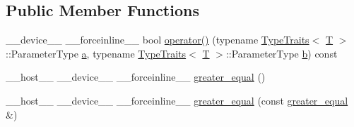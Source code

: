 \subsection*{Public Member Functions}
\begin{DoxyCompactItemize}
\item 
\-\_\-\-\_\-device\-\_\-\-\_\- \-\_\-\-\_\-forceinline\-\_\-\-\_\- bool \hyperlink{structcv_1_1gpu_1_1device_1_1greater__equal_adfbfbc0ec10ad992a95dff431334a5f9}{operator()} (typename \hyperlink{structcv_1_1gpu_1_1device_1_1TypeTraits}{Type\-Traits}$<$ \hyperlink{calib3d_8hpp_a3efb9551a871ddd0463079a808916717}{T} $>$\-::Parameter\-Type \hyperlink{legacy_8hpp_a1031d0e0a97a340abfe0a6ab9e831045}{a}, typename \hyperlink{structcv_1_1gpu_1_1device_1_1TypeTraits}{Type\-Traits}$<$ \hyperlink{calib3d_8hpp_a3efb9551a871ddd0463079a808916717}{T} $>$\-::Parameter\-Type \hyperlink{legacy_8hpp_ac04272e8ca865b8fba18d36edae9fd2a}{b}) const 
\item 
\-\_\-\-\_\-host\-\_\-\-\_\- \-\_\-\-\_\-device\-\_\-\-\_\- \-\_\-\-\_\-forceinline\-\_\-\-\_\- \hyperlink{structcv_1_1gpu_1_1device_1_1greater__equal_a576bca96cad532ba28a99a48cd88988c}{greater\-\_\-equal} ()
\item 
\-\_\-\-\_\-host\-\_\-\-\_\- \-\_\-\-\_\-device\-\_\-\-\_\- \-\_\-\-\_\-forceinline\-\_\-\-\_\- \hyperlink{structcv_1_1gpu_1_1device_1_1greater__equal_aff6de6dbcfa74ca9a99e2e7f4a37473e}{greater\-\_\-equal} (const \hyperlink{structcv_1_1gpu_1_1device_1_1greater__equal}{greater\-\_\-equal} \&)
\end{DoxyCompactItemize}


